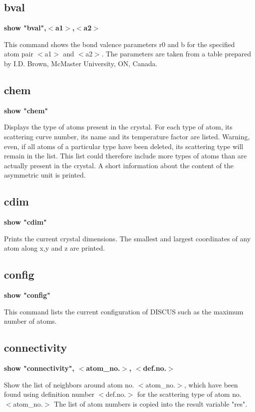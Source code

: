 \subsection*{bval}
{\bf show "bval",$ <$a1$> $,$ <$a2$> $ \par }
\par
\vspace{3pt}
This command shows the bond valence parameters r0 and b for the 
specified atom pair $ <$a1$> $ and $ <$a2$> $. The parameters are taken from 
a table prepared by I.D. Brown, McMaster University, ON, Canada. 
\subsection*{chem}
{\bf show "chem" \par }
\par
\vspace{3pt}
Displays the type of atoms present in the crystal. For each type of 
atom, its scattering curve number, its name and its temperature 
factor are listed. 
Warning, even, if all atoms of a particular type have been deleted, its 
scattering type will remain in the list. This list could therefore 
include more types of atoms than are actually present in the crystal. 
A short information about the content of the asymmetric unit is printed. 
\subsection*{cdim}
{\bf show "cdim" \par }
\par
\vspace{3pt}
Prints the current crystal dimensions. The smallest and largest 
coordinates of any atom along x,y and z are printed. 
\subsection*{config}
{\bf show "config" \par }
\par
\vspace{3pt}
This command lists the current configuration of DISCUS such as the 
maximum number of atoms. 
\subsection*{connectivity}
{\bf show "connectivity", $ <$atom\_no.$> $, $ <$def.no.$> $ \par }
\par
\vspace{3pt}
Show the list of neighbors around atom no. $ <$atom\_no.$> $, which have 
been found using definition number $ <$def.no.$> $ for the scattering 
type of atom no. $ <$atom\_no.$> $ 
The list of atom numbers is copied into the result variable "res". 
